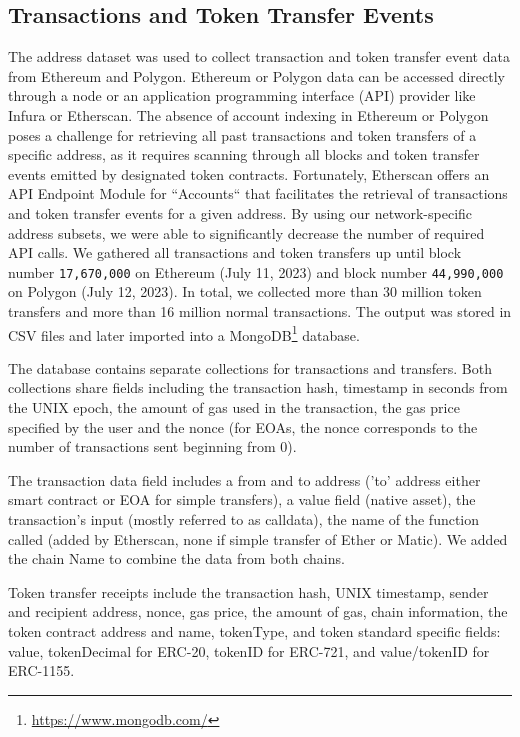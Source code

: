 \documentclass[12pt,a4paper,titlepage,oneside,english]{article}
\begin{document}
\subsection{Transactions and Token Transfer Events}
The address dataset was used to collect transaction and token transfer event data from Ethereum and Polygon. Ethereum or Polygon data can be accessed directly through a node or an application programming interface (API) provider like Infura or Etherscan. The absence of account indexing in Ethereum or Polygon poses a challenge for retrieving all past transactions and token transfers of a specific address, as it requires scanning through all blocks and token transfer events emitted by designated token contracts. Fortunately, Etherscan offers an API Endpoint Module for ``Accounts`` that facilitates the retrieval of transactions and token transfer events for a given address. By using our network-specific address subsets, we were able to significantly decrease the number of required API calls. 
We gathered all transactions and token transfers up until block number \texttt{17,670,000} on Ethereum (July 11, 2023) and block number \texttt{44,990,000} on Polygon (July 12, 2023). In total, we collected more than 30 million %
token transfers and more than 16 million %
 normal transactions. The output was stored in CSV files and later imported  into a MongoDB\footnote{\url{https://www.mongodb.com/}} database. 

The database contains separate collections for transactions and transfers. Both collections share fields including the transaction hash, timestamp in seconds from the UNIX epoch, the amount of gas used in the transaction, the gas price specified by the user and the nonce (for EOAs, the nonce corresponds to the number of transactions sent beginning from 0).

The transaction data field includes a from and to address ('to' address either smart contract or EOA for simple transfers), a value field (native asset), the transaction's input (mostly referred to as calldata), the name of the function called (added by Etherscan, none if simple transfer of Ether or Matic). We added the chain Name to combine the data from both chains.

Token transfer receipts include the transaction hash, UNIX timestamp, sender and recipient address, nonce, gas price, the amount of gas, chain information, the token contract address and name, tokenType, and token standard specific fields: value, tokenDecimal for ERC-20, tokenID for ERC-721, and value/tokenID for ERC-1155.
\end{document}
